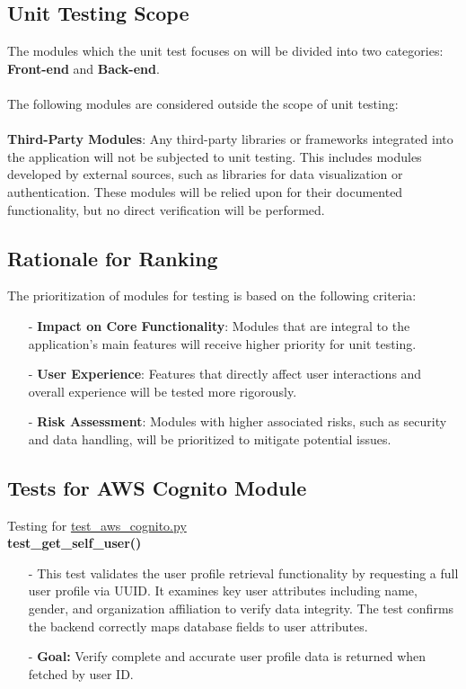 \documentclass[12pt, titlepage]{article}
\begin{document}
\subsection{Unit Testing Scope}
The modules which the unit test focuses on will be divided into two categories: \textbf{Front-end} and \textbf{Back-end}.\\\\
The following modules are considered outside the scope of unit testing:\\\\
\textbf{Third-Party Modules}: 
Any third-party libraries or frameworks integrated into the application will not be subjected to unit testing. This includes modules developed by external sources, such as libraries for data visualization or authentication. These modules will be relied upon for their documented functionality, but no direct verification will be performed.


\subsection{Rationale for Ranking}
The prioritization of modules for testing is based on the following criteria:
\begin{itemize}
    \item[-] \textbf{Impact on Core Functionality}: Modules that are integral to the application's main features will receive higher priority for unit testing.
    \item[-] \textbf{User Experience}: Features that directly affect user interactions and overall experience will be tested more rigorously.
    \item[-] \textbf{Risk Assessment}: Modules with higher associated risks, such as security and data handling, will be prioritized to mitigate potential issues.
\end{itemize}

\subsection{Tests for AWS Cognito Module}
Testing for \href{https://github.com/RezaJodeiri/CXR-Capstone/blob/main/src/backend/test/test_aws_conito.py}{test\_aws\_cognito.py} \\

\textbf{test\_get\_self\_user()}
\begin{itemize}
    \item[-] This test validates the user profile retrieval functionality by requesting a full user profile via UUID. It examines key user attributes including name, gender, and organization affiliation to verify data integrity. The test confirms the backend correctly maps database fields to user attributes.
    \item[-] \textbf{Goal:} Verify complete and accurate user profile data is returned when fetched by user ID.
\end{itemize}
\end{document}
